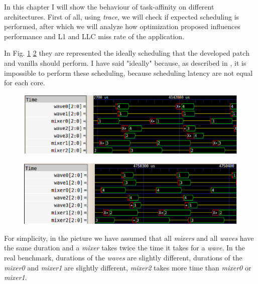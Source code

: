 In this chapter I will show the behaviour of task-affinity on different architectures. First of all, using \textit{trace}, we will check if expected 
scheduling is performed, after which we will analyze how optimization proposed influences performance and L1 and LLC miss rate of the application. 

In Fig. \ref{fig:schedule_taskaff} \ref{fig:schedule_van} they are represented the ideally scheduling that the developed patch and vanilla should perform. 
I have said "ideally" because, as described in \cite{lcs}, it is impossible to perform these scheduling, because scheduling latency are not equal for each 
core.
 
\begin{figure}[htbp]
\centering
\includegraphics[width=\widefigure]{images/results_xeon/4KB_results_xeon_taskaff.eps}
\caption{}
\label{fig:schedule_taskaff}
\end{figure}

\begin{figure}[htbp]
\centering
\includegraphics[width=\widefigure]{images/results_xeon/4KB_results_xeon_van.eps}
\caption{}
\label{fig:schedule_van}
\end{figure}

For simplicity, in the picture we have assumed that all \textit{mixers} and all \textit{waves} have the same duration and a \textit{mixer} takes twice the 
time it takes for a \textit{wave}. In the real benchmark, durations of the \textit{waves} are slightly different, durations of the \textit{mixer0} and 
\textit{mixer1} are slightly different, \textit{mixer2} takes more time than \textit{mixer0} or \textit{mixer1}.

